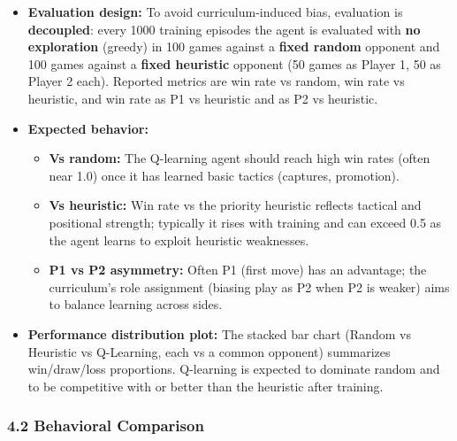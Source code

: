 \documentclass[
]{article}
\providecommand{\tightlist}{%
  \setlength{\itemsep}{0pt}\setlength{\parskip}{0pt}}
\begin{document}
\begin{itemize}
\tightlist
\item
  \textbf{Evaluation design:} To avoid curriculum-induced bias,
  evaluation is \textbf{decoupled}: every 1000 training episodes the
  agent is evaluated with \textbf{no exploration} (greedy) in 100 games
  against a \textbf{fixed random} opponent and 100 games against a
  \textbf{fixed heuristic} opponent (50 games as Player 1, 50 as Player
  2 each). Reported metrics are win rate vs random, win rate vs
  heuristic, and win rate as P1 vs heuristic and as P2 vs heuristic.
\item
  \textbf{Expected behavior:}

  \begin{itemize}
  \tightlist
  \item
    \textbf{Vs random:} The Q-learning agent should reach high win rates
    (often near 1.0) once it has learned basic tactics (captures,
    promotion).\\
  \item
    \textbf{Vs heuristic:} Win rate vs the priority heuristic reflects
    tactical and positional strength; typically it rises with training
    and can exceed 0.5 as the agent learns to exploit heuristic
    weaknesses.\\
  \item
    \textbf{P1 vs P2 asymmetry:} Often P1 (first move) has an advantage;
    the curriculum's role assignment (biasing play as P2 when P2 is
    weaker) aims to balance learning across sides.
  \end{itemize}
\item
  \textbf{Performance distribution plot:} The stacked bar chart (Random
  vs Heuristic vs Q-Learning, each vs a common opponent) summarizes
  win/draw/loss proportions. Q-learning is expected to dominate random
  and to be competitive with or better than the heuristic after
  training.
\end{itemize}

\subsubsection{4.2 Behavioral Comparison}\label{behavioral-comparison}
\end{document}
